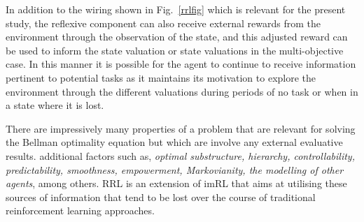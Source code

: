 \documentclass{article}
\begin{document}
In addition to the wiring shown in Fig.~\ref{rrlfig} which is relevant for the present study, 
the reflexive component can also receive external rewards from the environment through the observation of the state, and this adjusted reward can be used to inform the state valuation or state valuations in the multi-objective case. In this manner it is possible for the agent to continue to receive information pertinent to potential tasks as it maintains its motivation to explore the environment through the different valuations during periods of no task or when in a state where it is lost.



There are impressively many properties of a problem that are relevant for solving the 
Bellman optimality equation but which are involve any external evaluative results.
additional factors such as, \emph{optimal substructure, hierarchy, controllability, predictability, smoothness, empowerment, Markovianity, the modelling of other agents}, among others. RRL is an extension of imRL that aims at utilising these sources of information that tend to be lost over the course of traditional reinforcement learning approaches. 
\end{document}
